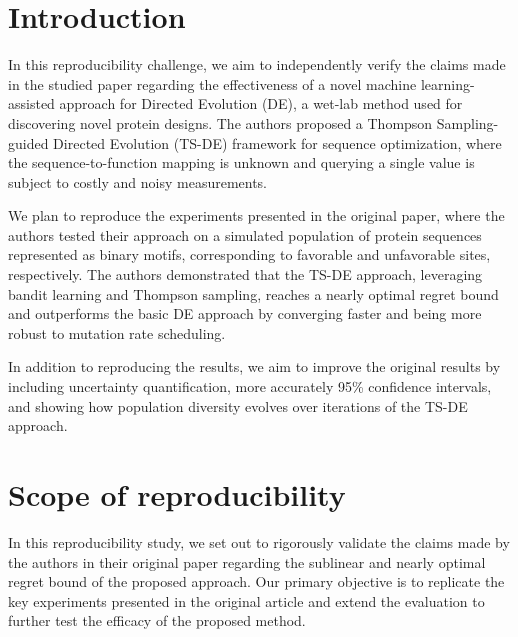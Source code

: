 \section{Introduction}
In this reproducibility challenge, we aim to independently verify the claims made in the studied paper regarding the effectiveness of a novel machine learning-assisted approach for Directed Evolution (DE), a wet-lab method used for discovering novel protein designs. The authors proposed a Thompson Sampling-guided Directed Evolution (TS-DE) framework for sequence optimization, where the sequence-to-function mapping is unknown and querying a single value is subject to costly and noisy measurements. 

We plan to reproduce the experiments presented in the original paper, where the authors tested their approach on a simulated population of protein sequences represented as binary motifs, corresponding to favorable and unfavorable sites, respectively. The authors demonstrated that the TS-DE approach, leveraging bandit learning and Thompson sampling, reaches a nearly optimal regret bound and outperforms the basic DE approach by converging faster and being more robust to mutation rate scheduling.

In addition to reproducing the results, we aim to improve the original results by including uncertainty quantification, more accurately 95\% confidence intervals, and showing how population diversity evolves over iterations of the TS-DE approach. 

\section{Scope of reproducibility}
\label{sec:claims}
In this reproducibility study, we set out to rigorously validate the claims made by the authors in their original paper regarding the sublinear and nearly optimal regret bound of the proposed approach. Our primary objective is to replicate the key experiments presented in the original article and extend the evaluation to further test the efficacy of the proposed method.

